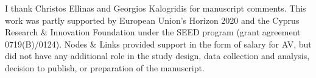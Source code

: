 \documentclass[reprint,aps,prl,amsmath,amssymb,superscriptaddress,showpacs]{revtex4-1}
\begin{document}
I thank Christos Ellinas and Georgios Kalogridis for manuscript comments. This work was partly supported by European Union's Horizon 2020 and the Cyprus Research \& Innovation Foundation under the SEED program (grant agreement 0719(B)/0124). Nodes \& Links provided support in the form of salary for AV, but did not have any additional role in the study design, data collection and analysis, decision to publish, or preparation of the manuscript. 



%


\end{document}
